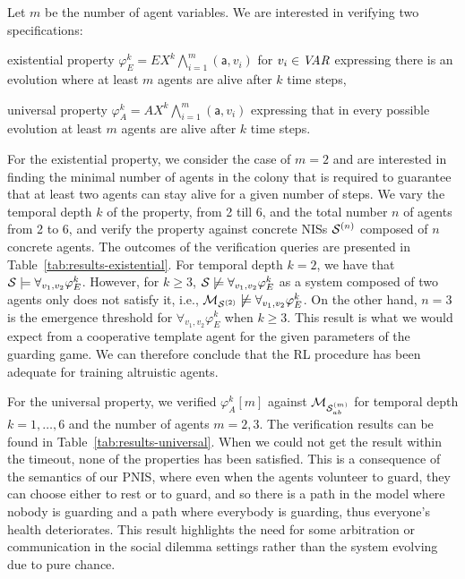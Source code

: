 Let $m$ be the number of agent variables. We are interested in verifying two
specifications:
\begin{inparaenum}[\it (i)]
\item existential property
  $\varphi^k_E = EX^k \bigwedge_{i=1}^m(\mathsf{a},v_i)$ for $v_i \in\it{VAR}$
  expressing there is an evolution where at least $m$ agents are alive after
  $k$ time steps,
\item universal property $\varphi^k_A = AX^k \bigwedge_{i=1}^m(\mathsf{a},v_i)$
  expressing that in every possible evolution at least $m$ agents are alive
  after $k$ time steps.
\end{inparaenum}

For the existential property, we consider the case of $m=2$ and are interested
in finding the minimal number of agents in the colony that is required to
guarantee that at least two agents can stay alive for a given number of
steps. We vary the temporal depth $k$ of the property, from 2 till 6, and the
total number $n$ of agents from 2 to 6, and verify the property against
concrete NISs $\mathcal{S}^{(n)}$ composed of $n$ concrete agents.  The outcomes of the
verification queries are presented in Table~\ref{tab:results-existential}.
%
For temporal depth $k=2$, we have that
$\mathcal S\models \forall_{v_1,v_2}\varphi^k_E$. However, for $k\geq 3$,
$\mathcal S\not\models\forall_{v_1,v_2}\varphi^k_E$ as a system composed of two
agents only does not satisfy it, i.e.,
$\mathcal{M}_{\mathcal{S}^{(2)}}\not\models\forall_{v_1,v_2}\varphi^k_E$. On the other hand, $n=3$ is
the emergence threshold for $\forall_{v_1,v_2}\varphi^k_E$ when $k\geq 3$. This
result is what we would expect from a cooperative template agent for the given
parameters of the guarding game. We can therefore conclude that the RL
procedure has been adequate for training altruistic agents.

For the universal property, we verified $\varphi^k_A[m]$ against $\mathcal{M}_{\mathcal{S}_{ab}^{(m)}}$
for temporal depth $k = 1,\dots,6$ and the number of agents $m=2,3$. The
verification results can be found in Table~\ref{tab:results-universal}.  When
we could not get the result within the timeout, none of the properties has been
satisfied. This is a consequence of the semantics of our PNIS, where even when
the agents volunteer to guard, they can choose either to rest or to guard, and
so there is a path in the model where nobody is guarding and a path where
everybody is guarding, thus everyone's health deteriorates. This result
highlights the need for some arbitration or communication in the social dilemma
settings rather than the system evolving due to pure chance.

